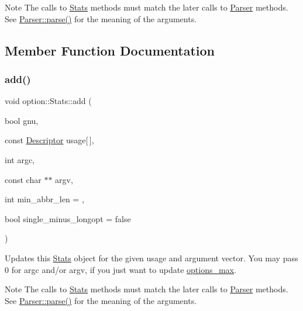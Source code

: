 \begin{DoxyNote}{Note}
The calls to \hyperlink{structoption_1_1Stats}{Stats} methods must match the later calls to \hyperlink{classoption_1_1Parser}{Parser} methods. See \hyperlink{classoption_1_1Parser_a6e0b5778d1cfbd6cd51240e74d01e138}{Parser\+::parse()} for the meaning of the arguments. 
\end{DoxyNote}


\subsection{Member Function Documentation}
\mbox{\label{structoption_1_1Stats_aa77e2a8b1704527d2d087820f4456143}} 
\subsubsection{\texorpdfstring{add()}{add()}}
{\footnotesize\ttfamily void option\+::\+Stats\+::add (\begin{DoxyParamCaption}\item[{bool}]{gnu,  }\item[{const \hyperlink{structoption_1_1Descriptor}{Descriptor}}]{usage\mbox{[}$\,$\mbox{]},  }\item[{int}]{argc,  }\item[{const char $\ast$$\ast$}]{argv,  }\item[{int}]{min\+\_\+abbr\+\_\+len = {},  }\item[{bool}]{single\+\_\+minus\+\_\+longopt = {\ttfamily false} }\end{DoxyParamCaption})\hspace{0.3cm}{\ttfamily [inline]}}



Updates this \hyperlink{structoption_1_1Stats}{Stats} object for the given {\ttfamily usage} and argument vector. You may pass 0 for {\ttfamily argc} and/or {\ttfamily argv}, if you just want to update \hyperlink{structoption_1_1Stats_a8121787feb1c7db84fca3ccb012b0473}{options\+\_\+max}. 

\begin{DoxyNote}{Note}
The calls to \hyperlink{structoption_1_1Stats}{Stats} methods must match the later calls to \hyperlink{classoption_1_1Parser}{Parser} methods. See \hyperlink{classoption_1_1Parser_a6e0b5778d1cfbd6cd51240e74d01e138}{Parser\+::parse()} for the meaning of the arguments. 
\end{DoxyNote}


